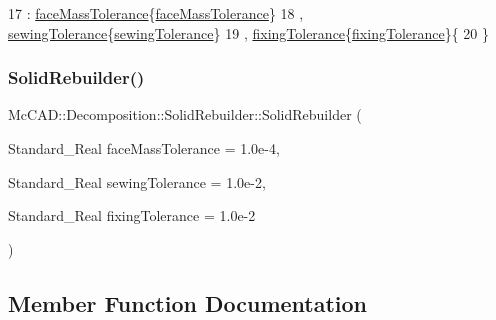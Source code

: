 \begin{DoxyCode}
17     : \hyperlink{classMcCAD_1_1Decomposition_1_1SolidRebuilder_a7f2b562442c029dfec153a3f16df5b79}{faceMassTolerance}\{\hyperlink{classMcCAD_1_1Decomposition_1_1SolidRebuilder_a7f2b562442c029dfec153a3f16df5b79}{faceMassTolerance}\}
18     , \hyperlink{classMcCAD_1_1Decomposition_1_1SolidRebuilder_a976ffb9b0eef03a646ba42eda6abaeb6}{sewingTolerance}\{\hyperlink{classMcCAD_1_1Decomposition_1_1SolidRebuilder_a976ffb9b0eef03a646ba42eda6abaeb6}{sewingTolerance}\}
19     , \hyperlink{classMcCAD_1_1Decomposition_1_1SolidRebuilder_a0daee0f1322cd101aa0f404a8aae0419}{fixingTolerance}\{\hyperlink{classMcCAD_1_1Decomposition_1_1SolidRebuilder_a0daee0f1322cd101aa0f404a8aae0419}{fixingTolerance}\}\{
20 \}
\end{DoxyCode}
\mbox{\label{classMcCAD_1_1Decomposition_1_1SolidRebuilder_a44d8d2538e3297c5c8b843a6e5aa130d}} 
\subsubsection{\texorpdfstring{Solid\+Rebuilder()}{SolidRebuilder()}\hspace{0.1cm}{\footnotesize\ttfamily [2/2]}}
{\footnotesize\ttfamily Mc\+C\+A\+D\+::\+Decomposition\+::\+Solid\+Rebuilder\+::\+Solid\+Rebuilder (\begin{DoxyParamCaption}\item[{Standard\+\_\+\+Real}]{face\+Mass\+Tolerance = {\ttfamily 1.0e-\/4},  }\item[{Standard\+\_\+\+Real}]{sewing\+Tolerance = {\ttfamily 1.0e-\/2},  }\item[{Standard\+\_\+\+Real}]{fixing\+Tolerance = {\ttfamily 1.0e-\/2} }\end{DoxyParamCaption})}



\subsection{Member Function Documentation}
\mbox{\label{classMcCAD_1_1Decomposition_1_1SolidRebuilder_a999dae53070de2c6681c51cfc6a56cd5}} 
